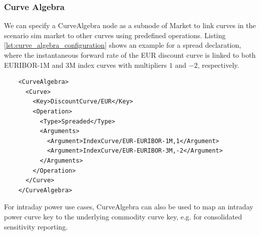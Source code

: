 

\subsubsection{Curve Algebra}\label{sec:sim_curve_algebra}

We can specify a CurveAlgebra node as a subnode of Market to link curves in the scenario sim market to other curves
using predefined operations. Listing \ref{lst:curve_algebra_configuration} shows an example for a spread declaration,
where the instantaneous forward rate of the EUR discount curve is linked to both EURIBOR-1M and 3M index curves with
multipliers $1$ and $-2$, respectively.

\begin{listing}
  \begin{verbatim}
    <CurveAlgebra>
      <Curve>
        <Key>DiscountCurve/EUR</Key>
        <Operation>
          <Type>Spreaded</Type>
          <Arguments>
            <Argument>IndexCurve/EUR-EURIBOR-1M,1</Argument>
            <Argument>IndexCurve/EUR-EURIBOR-3M,-2</Argument>
          </Arguments>
        </Operation>
      </Curve>
    </CurveAlgebra>
  \end{verbatim}
\caption{CurveAlgebra Node}
\label{lst:curve_algebra_configuration}
\end{listing}

For intraday power use cases, CurveAlgebra can also be used to map an intraday power curve key to the underlying
commodity curve key, e.g. for consolidated sensitivity reporting.


